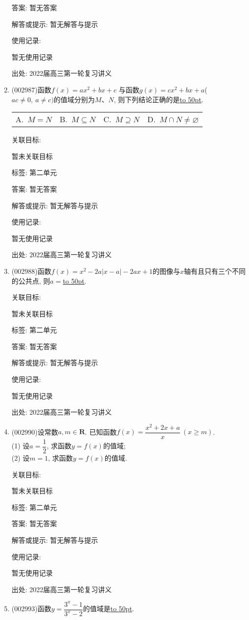 \documentclass[10pt,a4paper]{article}
\newcommand{\blank}[1]{\underline{\hbox to #1pt{}}}
\newcommand{\fourch}[4]{\par\begin{tabular}{p{.23\textwidth}p{.23\textwidth}p{.23\textwidth}p{.23\textwidth}}
A.~#1 &B.~#2& C.~#3& D.~#4
\end{tabular}}
\begin{document}
\begin{enumerate}[1.]
答案: 暂无答案

解答或提示: 暂无解答与提示

使用记录:

暂无使用记录


出处: 2022届高三第一轮复习讲义
\item { (002987)}函数$f(x)=ax^2+bx+c$ 与函数$g(x)=cx^2+bx+a$($ac\ne 0,\ a\ne c)$的值域分别为$M$、$N$, 则下列结论正确的是\blank{50}.
\fourch{$M=N$}{$M\subseteq N$}{$M\supseteq N$}{$M\cap N\ne \varnothing$}


关联目标:

暂未关联目标



标签: 第二单元

答案: 暂无答案

解答或提示: 暂无解答与提示

使用记录:

暂无使用记录


出处: 2022届高三第一轮复习讲义
\item { (002988)}函数$f(x)=x^2-2a|x-a|-2ax+1$的图像与$x$轴有且只有三个不同的公共点, 则$a=$\blank{50}.


关联目标:

暂未关联目标



标签: 第二单元

答案: 暂无答案

解答或提示: 暂无解答与提示

使用记录:

暂无使用记录


出处: 2022届高三第一轮复习讲义
\item { (002990)}设常数$a,m\in \mathbf{R}$. 已知函数$f(x)=\dfrac{x^2+2x+a}x\  (x\ge m)$.\\
(1) 设$a=\dfrac 12$, 求函数$y=f(x)$的值域;\\
(2) 设$m=1$, 求函数$y=f(x)$的值域.


关联目标:

暂未关联目标



标签: 第二单元

答案: 暂无答案

解答或提示: 暂无解答与提示

使用记录:

暂无使用记录


出处: 2022届高三第一轮复习讲义
\item { (002993)}函数$y=\dfrac{3^x-1}{3^x-2}$的值域是\blank{50}.



\end{enumerate}
\end{document}
